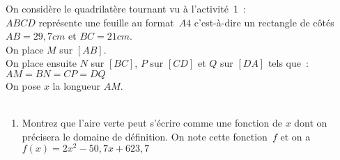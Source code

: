 \exercice On considère le quadrilatère tournant vu à l'activité~1~:\\[1em] \noindent
$ABCD$ représente une feuille au format~$A4$ c'est-à-dire un rectangle de côtés $AB = 29,7cm$ et $BC = 21cm$.\\
On place $M$ sur $[AB]$.\\
On place ensuite $N$ sur $[BC]$, $P$ sur $[CD]$ et $Q$ sur $[DA]$ tels que~:\\ $AM = BN = CP = DQ$\\[1em]
On pose $x$ la longueur $AM$.\\[1em]
\\[1em]
\begin{enumerate}
	\item Montrez que l'aire verte peut s'écrire comme une fonction de $x$ dont on précisera le domaine de définition. On note cette fonction~$f$ et on a $f(x) = 2x^2 - 50,7x + 623,7$
\end{enumerate}